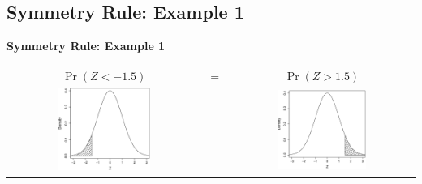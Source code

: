 \documentclass[compress]{beamer}        %
\makeatletter
\newcommand{\tcb}{\textcolor{beamer@blendedblue}}
\makeatother
\begin{document}
\subsection{Symmetry Rule: Example 1}
\begin{frame}{\bf \tcb{Symmetry Rule: Example 1}}
\begin{adjustwidth}{-0.2cm}{}
\begin{tabular}{c@{}c@{}c}
$\Pr(Z < -1.5)$ &$=$& $\Pr(Z > 1.5)$ \\
\includegraphics[width=0.5\textwidth, trim = 0.0cm 0.5cm 0.3cm 0.5cm, clip]{Symmetry1b}
&&
\includegraphics[width=0.5\textwidth, trim = 0.0cm 0.5cm 0.3cm 0.5cm, clip]{Symmetry1a}
\end{tabular}
\end{adjustwidth}

\end{frame}
\end{document}
